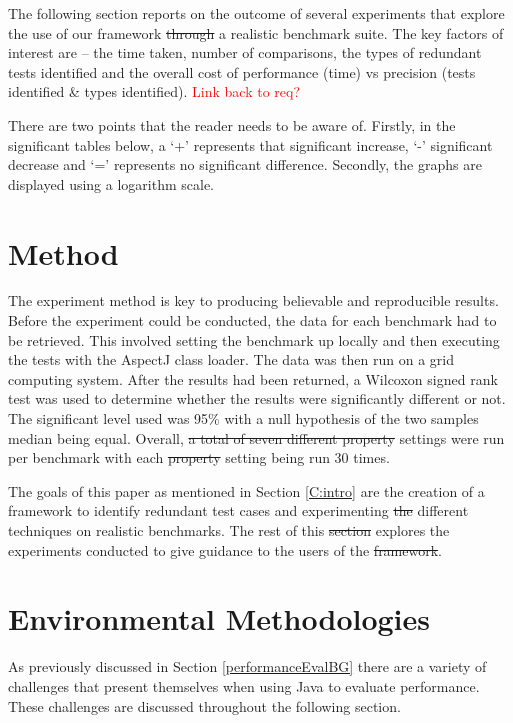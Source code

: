 \documentclass[11pt
              , a4paper
              , twoside
              , openright
              ]{report}
\newcommand\todo[1]{\textcolor{red}{#1}}
\providecommand{\DIFadd}[1]{{\protect\color{blue}\uwave{#1}}} %
\providecommand{\DIFdel}[1]{{\protect\color{red}\sout{#1}}}                      %
\providecommand{\DIFaddbegin}{} %
\providecommand{\DIFaddend}{} %
\providecommand{\DIFdelbegin}{} %
\providecommand{\DIFdelend}{} %
\begin{document}
The following section reports on the outcome of several experiments that explore the use of our framework \DIFdelbegin \DIFdel{through }\DIFdelend \DIFaddbegin \DIFadd{on }\DIFaddend a realistic benchmark suite. The key factors of interest are -- the time taken, number of comparisons, the types of redundant tests identified and the overall cost of performance (time) vs precision (tests identified \& types identified). \todo{Link back to req?}

There are two points that the reader needs to be aware of. Firstly, in the significant tables below, a `+' represents that significant increase, `-' significant decrease and `=' represents no significant difference. Secondly, the graphs are displayed using a logarithm scale.

\section{Method}

The experiment method is key to producing believable and reproducible results. Before the experiment could be conducted, the data for each benchmark had to be retrieved. This involved setting the benchmark up locally and then executing the tests with the AspectJ class loader. The data was then run on a grid computing system. After the results had been returned, a Wilcoxon signed rank test \cite{wilcoxon1945individual} was used to determine whether the results were significantly different or not. The significant level used was 95\% with a null hypothesis of the two samples median being equal. Overall, \DIFdelbegin \DIFdel{a total of seven different property }\DIFdelend \DIFaddbegin \DIFadd{seven different }\DIFaddend settings were run per benchmark with each \DIFdelbegin \DIFdel{property }\DIFdelend setting being run 30 times.

The goals of this paper as mentioned in Section \ref{C:intro} are the creation of a framework to identify redundant test cases and experimenting \DIFdelbegin \DIFdel{the }\DIFdelend \DIFaddbegin \DIFadd{with }\DIFaddend different techniques on realistic benchmarks. The rest of this \DIFdelbegin \DIFdel{section }\DIFdelend \DIFaddbegin \DIFadd{chapter }\DIFaddend explores the experiments conducted to give guidance to the users of the \DIFdelbegin \DIFdel{framework}\DIFdelend \DIFaddbegin \DIFadd{tool}\DIFaddend .

\section{Environmental Methodologies}
\label{enviro}
As previously discussed in Section \ref{performanceEvalBG} there are a variety of challenges that present themselves when using Java to evaluate performance. These challenges are discussed throughout the following section.
\end{document}

